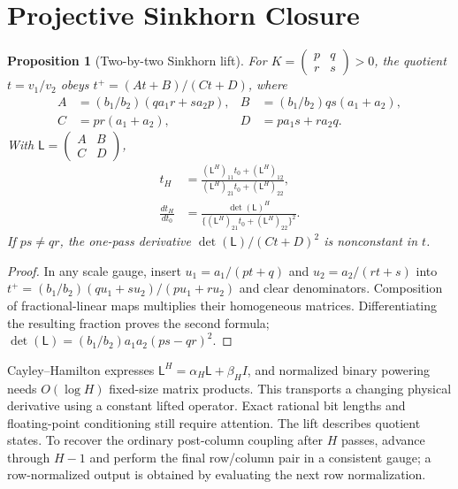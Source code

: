 \documentclass[journal]{IEEEtran}
\newtheorem{proposition}[theorem]{Proposition}
\theoremstyle{definition}
\begin{document}
\section{Projective Sinkhorn Closure}\label{app:projective}
\begin{proposition}[Two-by-two Sinkhorn lift]
\label{prop:sinkhorn-projective}
For $K=\left(\begin{smallmatrix}p&q\\r&s\end{smallmatrix}\right)>0$,
the quotient $t=v_1/v_2$ obeys $t^+=(At+B)/(Ct+D)$, where
\begin{align*}
 A&=(b_1/b_2)(q a_1r+s a_2p),&
 B&=(b_1/b_2)qs(a_1+a_2),\\
 C&=pr(a_1+a_2),&D&=p a_1s+r a_2q.
\end{align*}
With $\mathsf L=\left(\begin{smallmatrix}A&B\\C&D\end{smallmatrix}\right)$,
\begin{equation}\begin{aligned}
 t_H&=\frac{(\mathsf L^H)_{11}t_0+(\mathsf L^H)_{12}}
              {(\mathsf L^H)_{21}t_0+(\mathsf L^H)_{22}},\\
 \frac{dt_H}{dt_0}&=
 \frac{\det(\mathsf L)^H}{\{(\mathsf L^H)_{21}t_0+(\mathsf L^H)_{22}\}^2}.
\end{aligned}\label{eq:sinkhorn-projective-power}\end{equation}
If $ps\ne qr$, the one-pass derivative
$\det(\mathsf L)/(Ct+D)^2$ is nonconstant in $t$.
\end{proposition}
\begin{proof}
In any scale gauge, insert
$u_1=a_1/(pt+q)$ and $u_2=a_2/(rt+s)$ into
$t^+=(b_1/b_2)(qu_1+su_2)/(pu_1+ru_2)$ and clear denominators.
Composition of fractional-linear maps multiplies their homogeneous
matrices. Differentiating the resulting fraction proves the second formula;
$\det(\mathsf L)=(b_1/b_2)a_1a_2(ps-qr)^2$.
\end{proof}

Cayley--Hamilton expresses $\mathsf L^H=\alpha_H\mathsf L+\beta_HI$, and normalized binary
powering needs $O(\log H)$ fixed-size matrix products. This transports a
changing physical derivative using a constant lifted operator. Exact
rational bit lengths and floating-point conditioning still require attention.
The lift describes quotient states. To recover the ordinary post-column
coupling after $H$ passes, advance through $H-1$ and perform the final
row/column pair in a consistent gauge; a row-normalized output is obtained by evaluating the next row
normalization.
\end{document}
